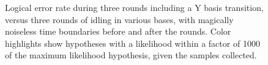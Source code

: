 \documentclass[onecolumn,unpublished,a4paper]{quantumarticle}
\theoremstyle{definition}
\theoremstyle{definition}
\theoremstyle{definition}
\begin{document}
\begin{figure}
    \centering
    \caption{
        Logical error rate during three rounds including a Y basis transition, versus three rounds of idling in various bases, with magically noiseless time boundaries before and after the rounds.
        Color highlights show hypotheses with a likelihood within a factor of 1000 of the maximum likelihood hypothesis, given the samples collected.
    }
    \label{fig:round_error_rate}
\end{figure}
\end{document}
